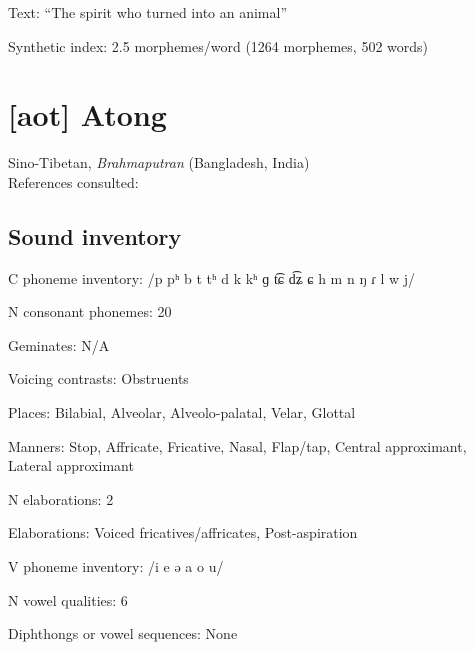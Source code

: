{\begin{appendixdesc}

\item[Text:] “The spirit who turned into an animal” \citep[323--331]{Bruce1984}

\item[Synthetic index:] 2.5 morphemes/word (1264 morphemes, 502 words)

\end{appendixdesc}
\section*{[aot] Atong}  %
Sino-Tibetan, \textit{Brahmaputran} (Bangladesh, India)\medskip\\
References consulted:  \citet{VanBreugel2008}

\subsection*{Sound inventory}
\begin{appendixdesc}

\item[C phoneme inventory:] /p pʰ b t tʰ d k kʰ ɡ t͡ɕ d͡ʑ ɕ h m n ŋ ɾ l w j/

\item[N consonant phonemes:] 20

\item[Geminates:] N/A

\item[Voicing contrasts:] Obstruents

\item[Places:] Bilabial, Alveolar, Alveolo-palatal, Velar, Glottal

\item[Manners:] Stop, Affricate, Fricative, Nasal, Flap/tap, Central approximant, Lateral approximant

\item[N elaborations:] 2

\item[Elaborations:] Voiced fricatives/affricates, Post-aspiration

\item[V phoneme inventory:] /i e ə a o u/

\item[N vowel qualities:] 6

\item[Diphthongs or vowel sequences:] None


\end{appendixdesc}}
